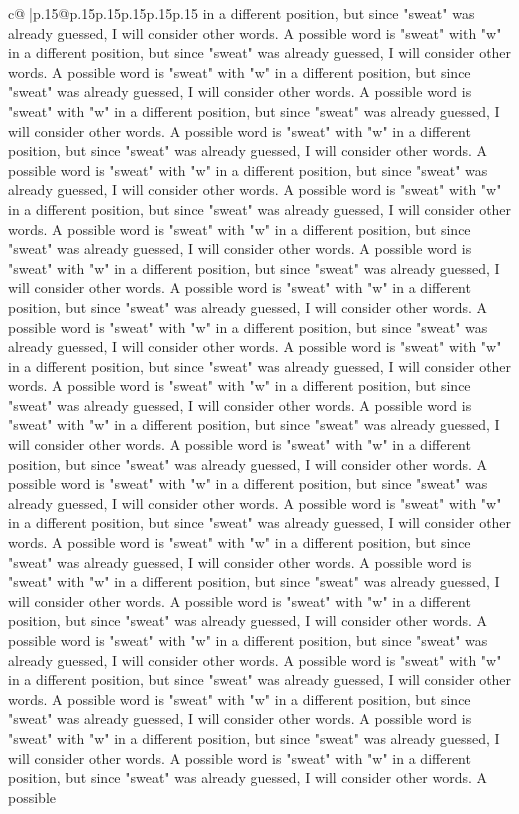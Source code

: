 \documentclass{article}
\begin{document}
{\begin{supertabular}{c@{$\;$}|p{.15\linewidth}@{}p{.15\linewidth}p{.15\linewidth}p{.15\linewidth}p{.15\linewidth}p{.15\linewidth}}
{{{in a different position, but since "sweat" was already guessed, I will consider other words. A possible word is "sweat" with "w" in a different position, but since "sweat" was already guessed, I will consider other words. A possible word is "sweat" with "w" in a different position, but since "sweat" was already guessed, I will consider other words. A possible word is "sweat" with "w" in a different position, but since "sweat" was already guessed, I will consider other words. A possible word is "sweat" with "w" in a different position, but since "sweat" was already guessed, I will consider other words. A possible word is "sweat" with "w" in a different position, but since "sweat" was already guessed, I will consider other words. A possible word is "sweat" with "w" in a different position, but since "sweat" was already guessed, I will consider other words. A possible word is "sweat" with "w" in a different position, but since "sweat" was already guessed, I will consider other words. A possible word is "sweat" with "w" in a different position, but since "sweat" was already guessed, I will consider other words. A possible word is "sweat" with "w" in a different position, but since "sweat" was already guessed, I will consider other words. A possible word is "sweat" with "w" in a different position, but since "sweat" was already guessed, I will consider other words. A possible word is "sweat" with "w" in a different position, but since "sweat" was already guessed, I will consider other words. A possible word is "sweat" with "w" in a different position, but since "sweat" was already guessed, I will consider other words. A possible word is "sweat" with "w" in a different position, but since "sweat" was already guessed, I will consider other words. A possible word is "sweat" with "w" in a different position, but since "sweat" was already guessed, I will consider other words. A possible word is "sweat" with "w" in a different position, but since "sweat" was already guessed, I will consider other words. A possible word is "sweat" with "w" in a different position, but since "sweat" was already guessed, I will consider other words. A possible word is "sweat" with "w" in a different position, but since "sweat" was already guessed, I will consider other words. A possible word is "sweat" with "w" in a different position, but since "sweat" was already guessed, I will consider other words. A possible word is "sweat" with "w" in a different position, but since "sweat" was already guessed, I will consider other words. A possible word is "sweat" with "w" in a different position, but since "sweat" was already guessed, I will consider other words. A possible word is "sweat" with "w" in a different position, but since "sweat" was already guessed, I will consider other words. A possible word is "sweat" with "w" in a different position, but since "sweat" was already guessed, I will consider other words. A possible word is "sweat" with "w" in a different position, but since "sweat" was already guessed, I will consider other words. A possible word is "sweat" with "w" in a different position, but since "sweat" was already guessed, I will consider other words. A possible }}}
\end{supertabular}}
\end{document}

